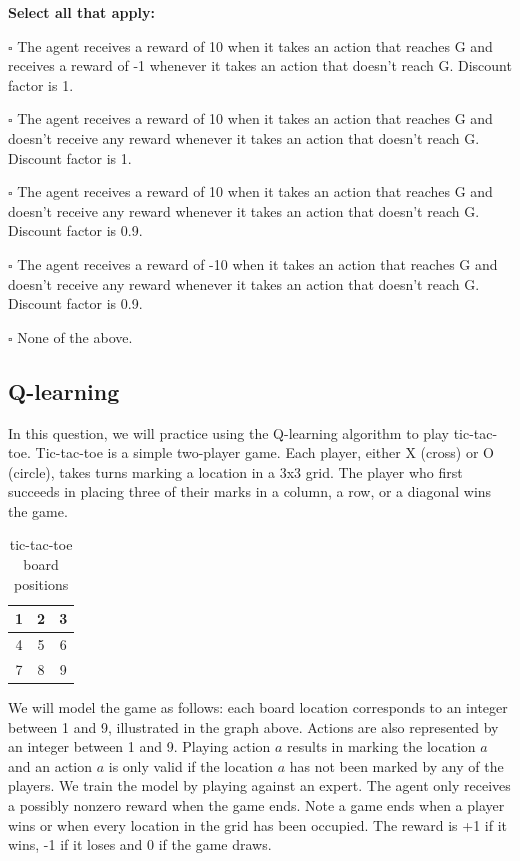 \begin{enumerate}
\textbf{Select all that apply:}
\begin{list}{}
    \item $\square$ The agent receives a reward of 10 when it takes an action that reaches G and receives a reward of -1 whenever it takes an action that doesn't reach G. Discount factor is 1.
    \item $\square$ The agent receives a reward of 10 when it takes an action that reaches G and doesn't receive any reward whenever it takes an action that doesn't reach G. Discount factor is 1.
    \item $\square$ The agent receives a reward of 10 when it takes an action that reaches G and doesn't receive any reward whenever it takes an action that doesn't reach G. Discount factor is 0.9.
    \item $\square$ The agent receives a reward of -10 when it takes an action that reaches G and doesn't receive any reward whenever it takes an action that doesn't reach G. Discount factor is 0.9.
    \item $\square$ None of the above.
\end{list}

\end{enumerate}

\clearpage

\subsection{Q-learning }
In this question, we will practice using the Q-learning algorithm to play tic-tac-toe. Tic-tac-toe is a simple two-player game. Each player, either X (cross) or O (circle), takes turns marking a location in a 3x3 grid. The player who first succeeds in placing three of their marks in a column, a row, or a diagonal wins the game.

\begin{table}[H]
\begin{center}
  \begin{tabular}{  c | c | c  }
    1 & 2 & 3\\ \hline
    4 & 5 & 6 \\ \hline
    7 & 8 & 9 \\ 
  \end{tabular}
 \caption{tic-tac-toe board positions}
\end{center}
\end{table}

We will model the game as follows: each board location corresponds to an integer between 1 and 9, illustrated in the graph above. Actions are also represented by an integer between 1 and 9. Playing action $a$ results in marking the location $a$ and an action $a$ is only valid if the location $a$ has not been marked by any of the players. We train the model by playing against an expert. The agent only receives a possibly nonzero reward when the game ends. Note a game ends when a player wins or when every location in the grid has been occupied. The reward is +1 if it wins, -1 if it loses and 0 if the game draws.


